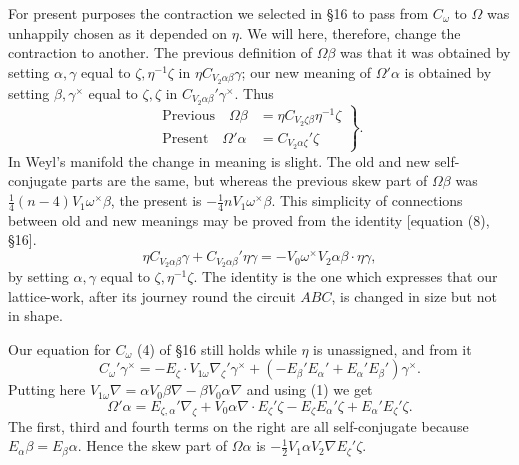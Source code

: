 \documentclass[11pt]{article}
\begin{document}
\indent For present purposes the contraction we selected in \S16 to pass from $C_\omega$ to $\Omega$ was unhappily chosen as it depended on $\eta$. We will here, therefore, change the contraction to another. The previous definition of $\Omega\beta$ was that it was obtained by setting $\alpha,\gamma$ equal to $\zeta,\eta^{-1}\zeta$ in $\eta C_{V_2\alpha\beta}\gamma$; our new meaning of $\Omega'\alpha$ is obtained by setting $\beta,\gamma^\times$ equal to $\zeta,\zeta$ in $C_{V_2\alpha\beta}'\gamma^\times$. Thus
\begin{equation}
\left.\begin{aligned}
\text{Previous}\quad \Omega\beta&=\eta C_{V_2\zeta\beta}\eta^{-1}\zeta\\
\text{Present}\quad \Omega'\alpha&=C_{V_2\alpha\zeta}'\zeta
\end{aligned}\right\}.\tag{1}
\end{equation}
\indent In Weyl's manifold the change in meaning is slight. The old and new self-conjugate parts are the same, but whereas the previous skew part of $\Omega\beta$ was $\tfrac14(n-4)V_1\omega^\times\beta$, the present is $-\tfrac14nV_1\omega^\times\beta$. This simplicity of connections between old and new meanings may be proved from the identity [equation (8), \S16].
\[
\eta C_{V_2\alpha\beta}\gamma+C_{V_2\alpha\beta}'\eta\gamma=-V_0\omega^\times V_2\alpha\beta\mathbin{\cdot}\eta\gamma,
\]
by setting $\alpha,\gamma$ equal to $\zeta,\eta^{-1}\zeta$. The identity is the one which expresses that our lattice-work, after its journey round the circuit $ABC$, is changed in size but not in shape.

\indent Our equation for $C_\omega$ (4) of \S16 still holds while $\eta$ is unassigned, and from it
\begin{equation}C_\omega'\gamma^\times=-E_\zeta\mathbin{\cdot}V_{1\omega}\nabla_\zeta'\gamma^\times+(-E_\beta'E_\alpha'+E_\alpha'E_\beta')\gamma^\times.\tag{2}\end{equation}
Putting here $V_{1\omega}\nabla=\alpha V_0\beta\nabla-\beta V_0\alpha\nabla$ and using (1) we get
\begin{equation}\Omega'\alpha=E_{\zeta,\alpha}'\nabla_\zeta+V_0\alpha\nabla\mathbin{\cdot}E_\zeta'\zeta-E_\zeta E_\alpha'\zeta+E_\alpha'E_\zeta'\zeta.\tag{3}\end{equation}
The first, third and fourth terms on the right are all self-conjugate because $E_\alpha\beta=E_\beta\alpha$. Hence the skew part of $\Omega\alpha$ is $-\tfrac12V_1\alpha V_2\nabla E_\zeta'\zeta$.
\end{document}

